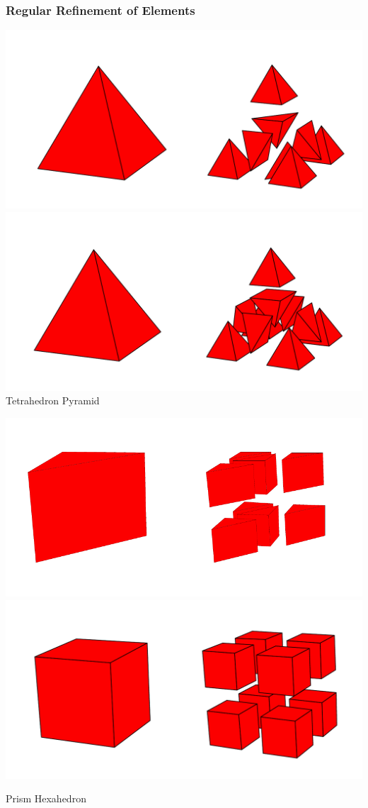 \begin{frame}
  \frametitle{Regular Refinement of Elements}

  \begin{center}
    \begin{minipage}{0.8\textwidth}
      \begin{center}
        \includegraphics[width=0.45\linewidth]{EPS/adaptivity/refinetet}
        \hfill
        \includegraphics[width=0.45\linewidth]{EPS/adaptivity/refinepyr}\\

        Tetrahedron \hspace*{3cm} Pyramid
      \end{center}
      \vspace{0.5cm}
      \begin{center}
        \includegraphics[width=0.45\linewidth]{EPS/adaptivity/refinepri}
        \hfill
        \includegraphics[width=0.45\linewidth]{EPS/adaptivity/refinehex}

        Prism \hspace*{3cm} Hexahedron
      \end{center}
    \end{minipage}
  \end{center}
\end{frame}


